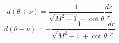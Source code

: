 \documentclass{article}
\begin{document}
\begin{equation}
d(\theta + \nu) = \frac{1}{\sqrt{M^2 - 1} - \cot\theta}\frac{dr}{r}
\end{equation}
\begin{equation}
d(\theta - \nu) = -\frac{1}{\sqrt{M^2 - 1} + \cot\theta}\frac{dr}{r}
\end{equation}
\end{document}
